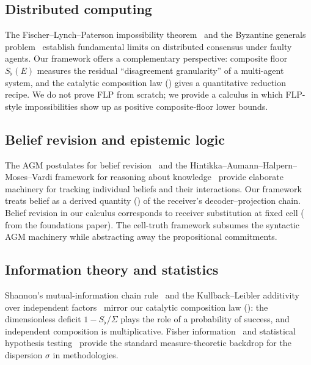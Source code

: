 \documentclass[11pt,a4paper]{article}
\newcommand{\Sfloor}{S_{\flat}}
\begin{document}
\subsection{Distributed computing}

The Fischer--Lynch--Paterson impossibility theorem~\cite{fischer1985}
and the Byzantine generals problem~\cite{lamport1982} establish
fundamental limits on distributed consensus under faulty agents. Our
framework offers a complementary perspective: composite floor
$\Sfloor(E)$ measures the residual ``disagreement granularity'' of a
multi-agent system, and the catalytic composition law
() gives a quantitative reduction recipe. We do
not prove FLP from scratch; we provide a calculus in which FLP-style
impossibilities show up as positive composite-floor
lower bounds.

\subsection{Belief revision and epistemic logic}

The AGM postulates for belief revision~\cite{alchourron1985} and the
Hintikka--Aumann--Halpern--Moses--Vardi framework for reasoning about
knowledge~\cite{hintikka1962,aumann1999,fagin1995} provide elaborate
machinery for tracking individual beliefs and their interactions.
Our framework treats belief as a derived quantity ()
of the receiver's decoder--projection chain. Belief revision in our
calculus corresponds to receiver substitution at fixed cell
( from the foundations paper). The cell-truth
framework subsumes the syntactic AGM machinery while abstracting
away the propositional commitments.

\subsection{Information theory and statistics}

Shannon's mutual-information chain rule~\cite{shannon1948,
coverthomas2006} and the Kullback--Leibler additivity over independent
factors~\cite{kullback1951} mirror our catalytic composition law
(): the dimensionless deficit $1-\Sfloor/\Sigma$
plays the role of a probability of success, and independent
composition is multiplicative. Fisher information~\cite{fisher1925}
and statistical hypothesis testing~\cite{lehmann2006,wasserman2004}
provide the standard measure-theoretic backdrop for the dispersion
$\sigma$ in methodologies.
\end{document}

